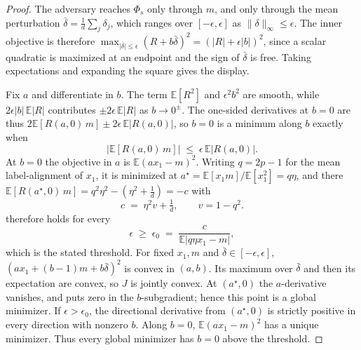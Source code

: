 \begin{proof}
The adversary reaches $\Phi_s$ only through $m$, and only through the mean perturbation
$\bar\delta = \frac{1}{d}\sum_j \delta_j$, which ranges over $[-\epsilon, \epsilon]$ as
$\lVert\delta\rVert_\infty \le \epsilon$. The inner objective is therefore
$\max_{\lvert\bar\delta\rvert\le\epsilon}(R + b\bar\delta)^2
= (\lvert R\rvert + \epsilon\lvert b\rvert)^2$, since a scalar quadratic is maximized at an endpoint
and the sign of $\bar\delta$ is free. Taking expectations and expanding the square gives the display.

Fix $a$ and differentiate in $b$. The term $\mathbb{E}[R^2]$ and $\epsilon^2 b^2$ are smooth, while
$2\epsilon\lvert b\rvert\,\mathbb{E}\lvert R\rvert$ contributes $\pm 2\epsilon\,\mathbb{E}\lvert R\rvert$
as $b\to 0^{\pm}$. The one-sided derivatives at $b=0$ are thus
$2\mathbb{E}[R(a,0)\,m] \pm 2\epsilon\,\mathbb{E}\lvert R(a,0)\rvert$, so $b=0$ is a minimum along $b$
exactly when
\begin{equation}
\big\lvert \mathbb{E}[R(a,0)\,m] \big\rvert \;\le\; \epsilon\,\mathbb{E}\lvert R(a,0)\rvert .
\label{eqn:kink}
\end{equation}
At $b=0$ the objective in $a$ is $\mathbb{E}(a x_1 - m)^2$. Writing $q=2p-1$ for the mean
label-alignment of $x_1$, it is minimized at
$a^\star = \mathbb{E}[x_1 m]/\mathbb{E}[x_1^2] = q\eta$, and there
$\mathbb{E}[R(a^\star,0)\,m] = q^2\eta^2 - (\eta^2 + \tfrac1d) = -c$ with
\begin{equation}
c \;=\; \eta^2 v + \tfrac{1}{d}, \qquad v = 1-q^2 .
\label{eqn:c}
\end{equation}
 therefore holds for every
\begin{equation}
\epsilon \;\ge\; \epsilon_0 \;=\; \frac{c}{\mathbb{E}\lvert q\eta x_1 - m\rvert},
\label{eqn:eps0}
\end{equation}
which is the stated threshold. For fixed $x_1,m$ and $\bar\delta\in[-\epsilon,\epsilon]$,
$(a x_1+(b-1)m+b\bar\delta)^2$ is convex in $(a,b)$. Its maximum over $\bar\delta$ and then its
expectation are convex, so $J$ is jointly convex. At $(a^\star,0)$ the $a$-derivative vanishes,
and  puts zero in the $b$-subgradient; hence this point is a global minimizer. If
$\epsilon>\epsilon_0$, the directional derivative from $(a^\star,0)$ is strictly positive in
every direction with nonzero $b$. Along $b=0$, $\mathbb E(a x_1-m)^2$ has a unique minimizer.
Thus every global minimizer has $b=0$ above the threshold.
\end{proof}

